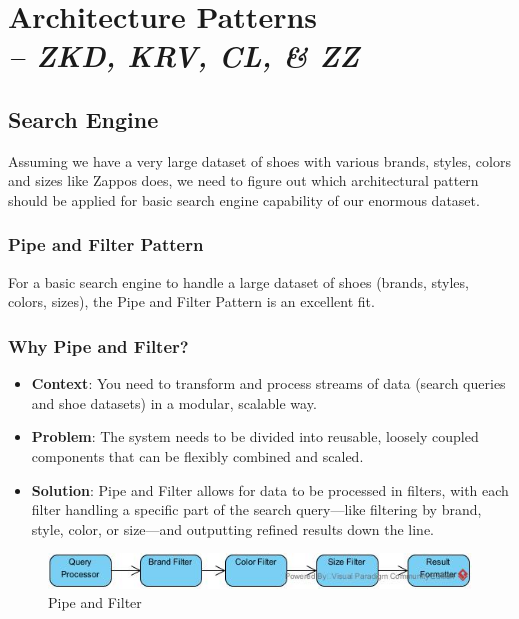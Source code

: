 \chapter{Architecture Patterns \\
\small{\textit{-- ZKD, KRV, CL, \& ZZ}}
\label{Chapter::Architecture Patterns}}

\section{Search Engine}
Assuming we have a very large dataset of shoes with various brands, styles, colors and sizes like Zappos \cite{zappos} does, we need to figure out which architectural pattern should be applied for basic search engine capability of our enormous dataset.

\subsection{Pipe and Filter Pattern}
For a basic search engine to handle a large dataset of shoes (brands, styles, colors, sizes), the Pipe and Filter Pattern is an excellent fit.

\subsection{Why Pipe and Filter?}
\begin{itemize}[leftmargin=*, label={\textbullet}]
    \item \textbf{Context}: You need to transform and process streams of data (search queries and shoe datasets) in a modular, scalable way.
    
    \item \textbf{Problem}: The system needs to be divided into reusable, loosely coupled components that can be flexibly combined and scaled.
    
    \item \textbf{Solution}: Pipe and Filter allows for data to be processed in filters, with each filter handling a specific part of the search query---like filtering by brand, style, color, or size---and outputting refined results down the line.
\end{itemize}

\begin{figure}[h]
    \centering
    \includegraphics[scale=0.7]{Book-SSW565/jpg/ArchitecturePatterns/Pipe and Filter.jpg}
    \caption{\label{Figure::Pipe and Filter}Pipe and Filter}
\end{figure}

